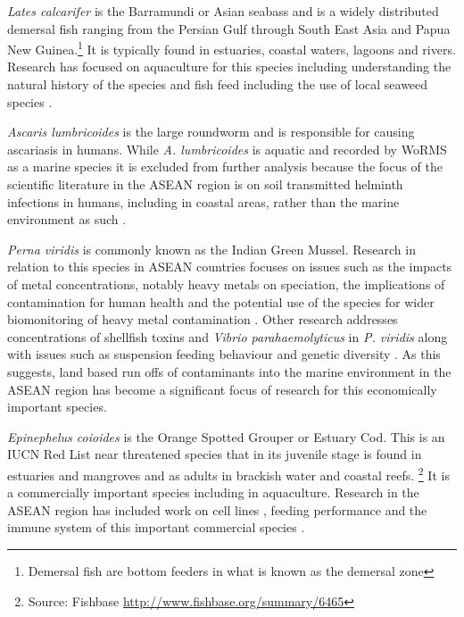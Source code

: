 \documentclass[]{book}
\let\rmarkdownfootnote\footnote%
\def\footnote{\protect\rmarkdownfootnote}
\theoremstyle{definition}
\theoremstyle{definition}
\theoremstyle{definition}
\theoremstyle{remark}
\begin{document}
\emph{Lates calcarifer} is the Barramundi or Asian seabass and is a
widely distributed demersal fish ranging from the Persian Gulf through
South East Asia and Papua New Guinea.\footnote{Demersal fish are bottom
  feeders in what is known as the demersal zone} It is typically found
in estuaries, coastal waters, lagoons and rivers. Research has focused
on aquaculture for this species including understanding the natural
history of the species \citep{Shadrin_2015} and fish feed
\citep{Shansudin_1997, Mohd_Yusof_2010} including the use of local
seaweed species \citep{Shapawi_2015}.

\emph{Ascaris lumbricoides} is the large roundworm and is responsible
for causing ascariasis in humans. While \emph{A. lumbricoides} is
aquatic and recorded by WoRMS as a marine species it is excluded from
further analysis because the focus of the scientific literature in the
ASEAN region is on soil transmitted helminth infections in humans,
including in coastal areas, rather than the marine environment as such
\citep{Montresor_2007}.

\emph{Perna viridis} is commonly known as the Indian Green Mussel.
Research in relation to this species in ASEAN countries focuses on
issues such as the impacts of metal concentrations, notably heavy metals
on speciation, the implications of contamination for human health and
the potential use of the species for wider biomonitoring of heavy metal
contamination \citep{Yap_2002, Yap_2004, Yap_2003}. Other research
addresses concentrations of shellfish toxins and \emph{Vibrio
parahaemolyticus} in \emph{P. viridis} \citep{Marasigan_2001} along with
issues such as suspension feeding behaviour
\citep{Hawkins_1998, Tan_2016} and genetic diversity \citep{Ye_2015}. As
this suggests, land based run offs of contaminants into the marine
environment in the ASEAN region has become a significant focus of
research for this economically important species.

\emph{Epinephelus coioides} is the Orange Spotted Grouper or Estuary
Cod. This is an IUCN Red List near threatened species that in its
juvenile stage is found in estuaries and mangroves and as adults in
brackish water and coastal reefs. \footnote{Source: Fishbase
  \url{http://www.fishbase.org/summary/6465}} It is a commercially
important species including in aquaculture. Research in the ASEAN region
has included work on cell lines \citep{Qin_2006}, feeding performance
\citep{Doi_1997, Eusebio_2004} and the immune system of this important
commercial species \citep{Zhou_2011, Guo_2012}.
\end{document}
